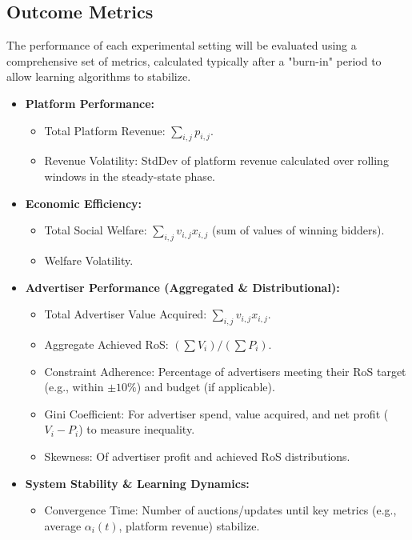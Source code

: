 \documentclass[12pt, a4paper]{article}
\begin{document}
\subsection{Outcome Metrics} \label{sec:outcome_metrics}
The performance of each experimental setting will be evaluated using a comprehensive set of metrics, calculated typically after a "burn-in" period to allow learning algorithms to stabilize.
\begin{itemize}
    \item \textbf{Platform Performance:}
        \begin{itemize}
            \item Total Platform Revenue: $\sum_{i,j} p_{i,j}$.
            \item Revenue Volatility: StdDev of platform revenue calculated over rolling windows in the steady-state phase.
        \end{itemize}
    \item \textbf{Economic Efficiency:}
        \begin{itemize}
            \item Total Social Welfare: $\sum_{i,j} v_{i,j} x_{i,j}$ (sum of values of winning bidders).
            \item Welfare Volatility.
        \end{itemize}
    \item \textbf{Advertiser Performance (Aggregated \& Distributional):}
        \begin{itemize}
            \item Total Advertiser Value Acquired: $\sum_{i,j} v_{i,j} x_{i,j}$.
            \item Aggregate Achieved RoS: $(\sum V_i) / (\sum P_i)$.
            \item Constraint Adherence: Percentage of advertisers meeting their RoS target (e.g., within $\pm10\%$) and budget (if applicable).
            \item Gini Coefficient: For advertiser spend, value acquired, and net profit ($V_i - P_i$) to measure inequality.
            \item Skewness: Of advertiser profit and achieved RoS distributions.
        \end{itemize}
    \item \textbf{System Stability \& Learning Dynamics:}
        \begin{itemize}
            \item Convergence Time: Number of auctions/updates until key metrics (e.g., average $\alpha_i(t)$, platform revenue) stabilize.

\end{itemize}
\end{itemize}
\end{document}
